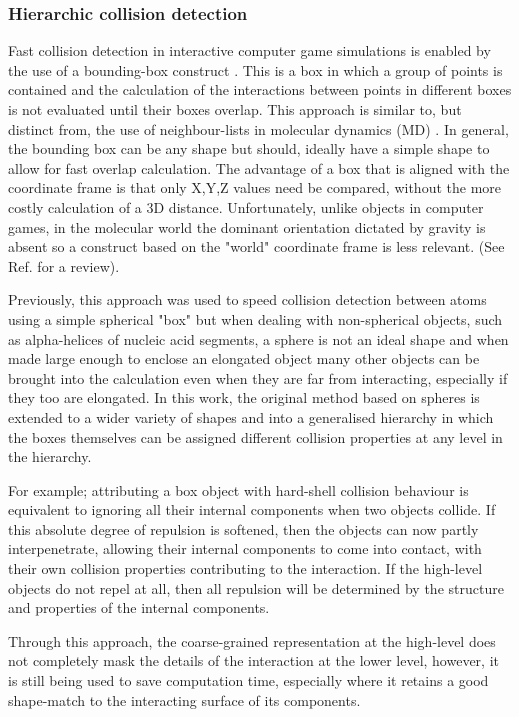 \documentclass[review]{elsarticle}
\begin{document}
\subsubsection{Hierarchic collision detection}

Fast collision detection in interactive computer game simulations is enabled by the
use of a bounding-box construct \cite{TeschnerMet05}.  This is a box in which a group of points is contained
and the calculation of the interactions between points in different boxes is not
evaluated until their boxes overlap.    This approach is similar to, but distinct from,
the use of neighbour-lists in molecular dynamics (MD) \cite{VerletL67}.   In general, the bounding
box can be any shape but should, ideally have a simple shape to allow for fast
overlap calculation.    The advantage of a box that is aligned with the coordinate
frame is that only X,Y,Z values need be compared, without the more costly calculation
of a 3D distance. Unfortunately, unlike objects in computer games, in the molecular
world the dominant orientation dictated by gravity is absent so a construct based
on the "world" coordinate frame is less relevant.  (See Ref.\cite{MuthBet07} for a review).

Previously, this approach was used to speed collision detection
between atoms using a simple spherical "box" \cite{TaylorWRet10a}
but when dealing with non-spherical objects,
such as alpha-helices of nucleic acid segments, a sphere is not an ideal shape and
when made large enough to enclose an elongated object many other objects can be
brought into the calculation even when they are far from interacting, especially if
they too are elongated.   In this work, the original method based on spheres is
extended to a wider variety of shapes and into a generalised hierarchy in which the
boxes themselves can be assigned different collision properties at any level in the
hierarchy. 

For example; attributing a box object with hard-shell collision behaviour is equivalent to
ignoring all their internal components when two objects collide.    If this absolute
degree of repulsion is softened, then the objects can now partly interpenetrate,
allowing their internal components to come into contact, with their own collision
properties contributing to the interaction.   If the high-level objects do not
repel at all, then all repulsion will be determined by the structure and properties of
the internal components.

Through this approach, the coarse-grained representation at the high-level does not
completely mask the details of the interaction at the lower level, however, it is still being
used to save computation time, especially where it retains a good shape-match to the
interacting surface of its components.
\end{document}
